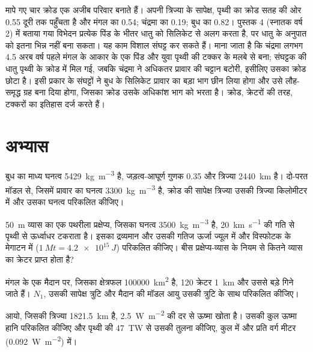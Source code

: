 मापे गए चार क्रोड एक अजीब परिवार बनाते हैं। अपनी त्रिज्या के सापेक्ष, पृथ्वी का
क्रोड सतह की ओर 0.55 दूरी तक पहुँचता है और मंगल का 0.54;
चंद्रमा का 0.19; बुध का 0.82। पुस्तक 4 (स्नातक वर्ष 2) में बताया गया विभेदन
प्रत्येक पिंड के भीतर धातु को सिलिकेट से अलग करता है, पर धातु के अनुपात को
इतना भिन्न नहीं बना सकता। यह काम विशाल संघट्ट कर सकते हैं। माना जाता है कि चंद्रमा
लगभग 4.5 अरब वर्ष पहले मंगल के आकार के एक पिंड और युवा पृथ्वी की टक्कर के मलबे से बना;
संघट्टक की धातु पृथ्वी के क्रोड में मिल गई, जबकि चंद्रमा ने अधिकतर प्रावार की चट्टान बटोरी,
इसीलिए उसका क्रोड छोटा है। इसी प्रकार के संघट्टों ने बुध के सिलिकेट प्रावार का
बड़ा भाग छीन लिया होगा और उसे लौह-समृद्ध ग्रह बना दिया होगा, जिसका क्रोड
उसके अधिकांश भाग को भरता है। क्रोड, क्रेटरों की तरह, टक्करों का
इतिहास दर्ज करते हैं।

\section{अभ्यास}

\begin{exercise}[$\star$]\label{exo:b3:planetary-interiors-surfaces:1}
बुध का माध्य घनत्व \qty{5429}{kg.m^{-3}} है, जड़त्व-आघूर्ण
गुणक 0.35 और त्रिज्या \qty{2440}{km} है। दो-परत मॉडल से, जिसमें प्रावार का
घनत्व \qty{3300}{kg.m^{-3}} है, क्रोड की सापेक्ष त्रिज्या
उसकी त्रिज्या किलोमीटर में और उसका घनत्व परिकलित कीजिए।
\end{exercise}

\begin{exercise}[$\star$]\label{exo:b3:planetary-interiors-surfaces:2}
\qty{50}{m} व्यास का एक पथरीला प्रक्षेप्य, जिसका घनत्व \qty{3500}{kg.m^{-3}} है,
\qty{20}{km.s^{-1}} की गति से पृथ्वी से ऊर्ध्वाधर टकराता है। इसका द्रव्यमान और
उसकी गतिज ऊर्जा ज्यूल में और विस्फोटक के मेगाटन में
($\qty{1}{Mt} = \qty{4.2e15}{J}$) परिकलित कीजिए। बीस प्रक्षेप्य-व्यास के नियम से
कितने व्यास का क्रेटर प्राप्त होता है?
\end{exercise}

\begin{exercise}[$\star$]\label{exo:b3:planetary-interiors-surfaces:3}
मंगल के एक मैदान पर, जिसका क्षेत्रफल \qty{100000}{km^2} है, 120 क्रेटर \qty{1}{km} और
उससे बड़े गिने जाते हैं। $N_1$, उसकी सापेक्ष त्रुटि और मैदान की मॉडल आयु
उसकी त्रुटि के साथ परिकलित कीजिए।
\end{exercise}

\begin{exercise}[$\star$]\label{exo:b3:planetary-interiors-surfaces:4}
आयो, जिसकी त्रिज्या \qty{1821.5}{km} है, \qty{2.5}{W.m^{-2}} की दर से ऊष्मा खोता है। उसकी
कुल ऊष्मा हानि परिकलित कीजिए और पृथ्वी की \qty{47}{TW} से उसकी तुलना कीजिए,
कुल में और प्रति वर्ग मीटर (\qty{0.092}{W.m^{-2}}) में।
\end{exercise}

